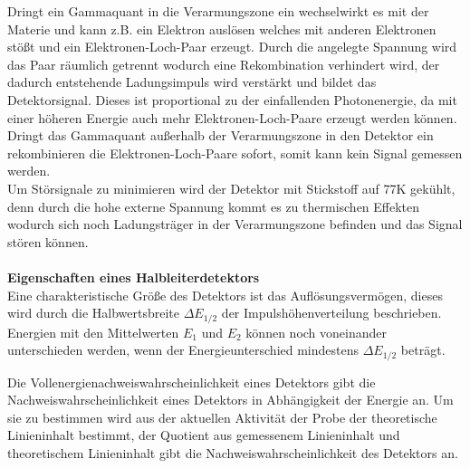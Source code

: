 Dringt ein Gammaquant in die Verarmungszone ein wechselwirkt es mit der Materie und kann
z.B. ein Elektron auslösen welches mit anderen Elektronen stößt und ein Elektronen-Loch-Paar erzeugt.
Durch die angelegte Spannung wird das Paar räumlich getrennt wodurch eine Rekombination verhindert wird,
der dadurch entstehende Ladungsimpuls
wird verstärkt und bildet das Detektorsignal. Dieses ist proportional zu der einfallenden Photonenergie, da mit
einer höheren Energie auch mehr Elektronen-Loch-Paare erzeugt werden können.
Dringt das Gammaquant außerhalb der Verarmungszone in den Detektor ein rekombinieren die
Elektronen-Loch-Paare sofort, somit kann kein Signal gemessen werden.\\
Um Störsignale zu minimieren wird der Detektor mit Stickstoff auf 77\;K gekühlt, denn durch die
hohe externe Spannung kommt es zu thermischen Effekten wodurch sich noch Ladungsträger in der Verarmungszone
befinden und das Signal stören können.
\\
\\
\textbf{Eigenschaften eines Halbleiterdetektors}\\
Eine charakteristische Größe des Detektors ist das Auflösungsvermögen, dieses wird durch die
Halbwertsbreite $\Delta E_{1/2}$ der Impulshöhenverteilung beschrieben. Energien mit den Mittelwerten
$E_1$ und $E_2$ können noch voneinander unterschieden werden, wenn der Energieunterschied mindestens
$\Delta E_{1/2}$ beträgt.

Die Vollenergienachweiswahrscheinlichkeit eines Detektors gibt die Nachweiswahrscheinlichkeit eines Detektors
in Abhängigkeit der Energie an. Um sie zu bestimmen wird aus der aktuellen Aktivität der Probe der
theoretische Linieninhalt bestimmt, der Quotient aus gemessenem Linieninhalt und theoretischem
Linieninhalt gibt die Nachweiswahrscheinlichkeit des Detektors an.


